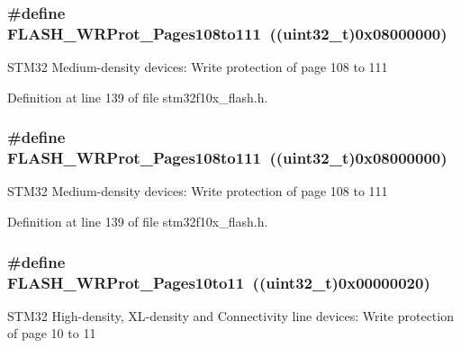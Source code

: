\subsubsection[{\texorpdfstring{F\+L\+A\+S\+H\+\_\+\+W\+R\+Prot\+\_\+\+Pages108to111}{FLASH_WRProt_Pages108to111}}]{\setlength{\rightskip}{0pt plus 5cm}\#define F\+L\+A\+S\+H\+\_\+\+W\+R\+Prot\+\_\+\+Pages108to111~(({\bf uint32\+\_\+t})0x08000000)}\hypertarget{group___option___bytes___write___protection_ga899e34df1ab5369d840461686eb9c318}{}\label{group___option___bytes___write___protection_ga899e34df1ab5369d840461686eb9c318}
S\+T\+M32 Medium-\/density devices\+: Write protection of page 108 to 111 

Definition at line 139 of file stm32f10x\+\_\+flash.\+h.

\subsubsection[{\texorpdfstring{F\+L\+A\+S\+H\+\_\+\+W\+R\+Prot\+\_\+\+Pages108to111}{FLASH_WRProt_Pages108to111}}]{\setlength{\rightskip}{0pt plus 5cm}\#define F\+L\+A\+S\+H\+\_\+\+W\+R\+Prot\+\_\+\+Pages108to111~(({\bf uint32\+\_\+t})0x08000000)}\hypertarget{group___option___bytes___write___protection_ga899e34df1ab5369d840461686eb9c318}{}\label{group___option___bytes___write___protection_ga899e34df1ab5369d840461686eb9c318}
S\+T\+M32 Medium-\/density devices\+: Write protection of page 108 to 111 

Definition at line 139 of file stm32f10x\+\_\+flash.\+h.

\subsubsection[{\texorpdfstring{F\+L\+A\+S\+H\+\_\+\+W\+R\+Prot\+\_\+\+Pages10to11}{FLASH_WRProt_Pages10to11}}]{\setlength{\rightskip}{0pt plus 5cm}\#define F\+L\+A\+S\+H\+\_\+\+W\+R\+Prot\+\_\+\+Pages10to11~(({\bf uint32\+\_\+t})0x00000020)}\hypertarget{group___option___bytes___write___protection_ga778d8038df46c0d25d9a24717a5c5dc9}{}\label{group___option___bytes___write___protection_ga778d8038df46c0d25d9a24717a5c5dc9}
S\+T\+M32 High-\/density, X\+L-\/density and Connectivity line devices\+: Write protection of page 10 to 11 

